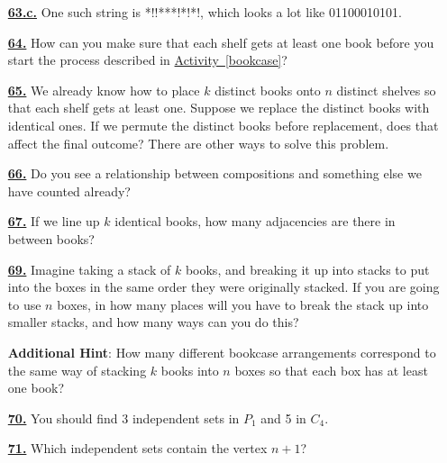 \documentclass[10pt,]{book}
\theoremstyle{plain}
\theoremstyle{definition}
\theoremstyle{definition}
\theoremstyle{definition}
\numberwithin{equation}{chapter}
\begin{document}
\begin{itemize}[itemsep=1em]
\hypertarget{a-63.c}{}\item[\textbf{\hyperref[task-100]{63.c.}}]
\hypertarget{p-414}{}%
One such string is *!!***!*!*!, which looks a lot like 01100010101.%

\hypertarget{a-64}{}\item[\textbf{\hyperref[bookcaseeveryshelf]{64.}}]
\hypertarget{p-425}{}%
How can you make sure that each shelf gets at least one book before you start the process described in \hyperref[bookcase]{Activity~\ref{bookcase}}?%

\hypertarget{a-65}{}\item[\textbf{\hyperref[activity-65]{65.}}]
\hypertarget{p-429}{}%
We already know how to place \(k\) distinct books onto \(n\) distinct shelves so that each shelf gets at least one. Suppose we replace the distinct books with identical ones. If we permute the distinct books before replacement, does that affect the final outcome? There are other ways to solve this problem.%

\hypertarget{a-66}{}\item[\textbf{\hyperref[compositionagian]{66.}}]
\hypertarget{p-432}{}%
Do you see a relationship between compositions and something else we have counted already?%

\hypertarget{a-67}{}\item[\textbf{\hyperref[activity-67]{67.}}]
\hypertarget{p-435}{}%
If we line up \(k\) identical books, how many adjacencies are there in between books?%

\hypertarget{a-69}{}\item[\textbf{\hyperref[brokenpermutation]{69.}}]
\hypertarget{p-442}{}%
Imagine taking a stack of \(k\) books, and breaking it up into stacks to put into the boxes in the same order they were originally stacked. If you are going to use \(n\) boxes, in how many places will you have to break the stack up into smaller stacks, and how many ways can you do this?%

\par\smallskip
\noindent\textbf{Additional Hint}: \hypertarget{p-443}{}%
How many different bookcase arrangements correspond to the same way of stacking \(k\) books into \(n\) boxes so that each box has at least one book?%

\hypertarget{a-70}{}\item[\textbf{\hyperref[activity-70]{70.}}]
\hypertarget{p-454}{}%
You should find 3 independent sets in \(P_1\) and 5 in \(C_4\).%

\hypertarget{a-71}{}\item[\textbf{\hyperref[activity-71]{71.}}]
\hypertarget{p-458}{}%
Which independent sets contain the vertex \(n+1\)?%


\end{itemize}
\end{document}
